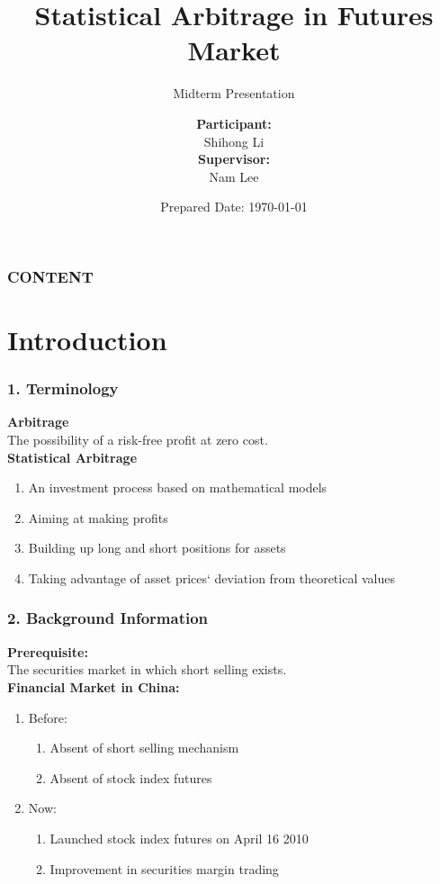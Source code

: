 \documentclass[compress,handout,10pt]{beamer}
\title{{\color{black} \LARGE Statistical Arbitrage in Futures Market\newline} }
\subtitle{{\color{black} Midterm Presentation\large } }
\author{ 
    {\bf{Participant:}} \\ 
Shihong Li\\ 
    \vspace{5pt}
    {\bf{Supervisor:}} \\ 
Nam Lee\\ 
    \vspace{5pt}
}
\institute{
{\bf{Sponsor:}}\\
Greenwoods Asset Management Ltd.\\
\vspace{5pt}
}
\date{\mygreen Prepared Date: \today}
\let\olditem\item
\renewcommand{\item}{\setlength{\itemsep}{0.5\baselineskip}\olditem}
\begin{document}
\begin{frame}[plain]
    \titlepage
\end{frame}

\begin{frame}
    \frametitle{CONTENT}
    \tableofcontents
\end{frame}

\section{Introduction}

\begin{frame}
    \frametitle{1. Terminology}
{\bf{Arbitrage}} \\The possibility of a risk-free profit at zero cost. \\
\vspace{7pt}
{\bf{Statistical Arbitrage}}
             \begin{enumerate}
                 \item An investment process based on mathematical models
                 \item Aiming at making profits
                 \item Building up long and short positions for assets
                 \item Taking advantage of asset prices` deviation from theoretical values
             \end{enumerate}
\end{frame}

\begin{frame}
    \frametitle{2. Background Information}
{\bf{Prerequisite:}}\\
\vspace{3pt}
The securities market in which short selling exists.\\
\vspace{7pt}
{\bf{Financial Market in China:}}\\
    \begin{enumerate}
        \item Before: 
            \begin{enumerate}
                \item Absent of short selling mechanism
                \item Absent of stock index futures
            \end{enumerate}
        \item Now:
            \begin{enumerate}
                \item Launched stock index futures on April 16 2010
                \item Improvement in securities margin trading
            \end{enumerate}
    \end{enumerate}
\end{frame}
\end{document}
